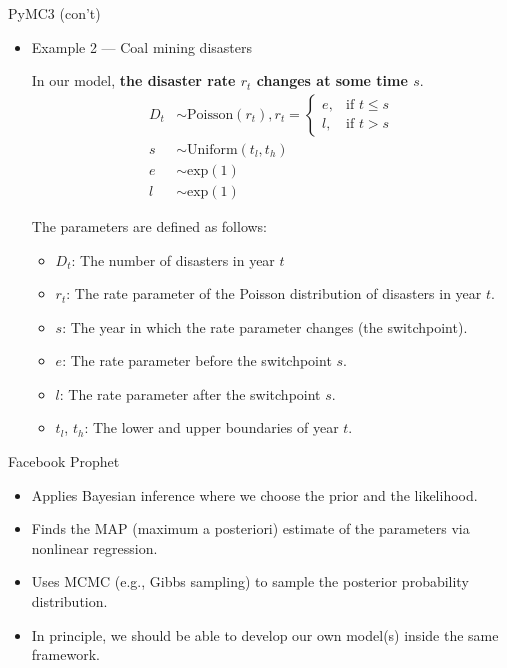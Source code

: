 \documentclass[20pt]{beamer}
\begin{document}
\begin{frame}{PyMC3 (con't)}
\begin{itemize}

  \item Example 2 --- Coal mining disasters

In our model, \textbf{the disaster rate $r_t$ changes at some time $s$}.
\begin{align*}
  D_t &\sim \text{Poisson}(r_t), r_t= \begin{cases}
   e, & \text{if } t \le s \\
   l, & \text{if } t > s
   \end{cases} \\
  s &\sim \text{Uniform}(t_l, t_h)\\
  e &\sim \text{exp}(1)\\
  l &\sim \text{exp}(1)
\end{align*}

The parameters are defined as follows:
  \begin{itemize}
   \item $D_t$: The number of disasters in year $t$
   \item $r_t$: The rate parameter of the Poisson distribution of disasters in year $t$.
   \item $s$: The year in which the rate parameter changes (the switchpoint).
   \item $e$: The rate parameter before the switchpoint $s$.
   \item $l$: The rate parameter after the switchpoint $s$.
   \item $t_l$, $t_h$: The lower and upper boundaries of year $t$.
  \end{itemize}
\end{itemize}
\end{frame}


\begin{frame}{Facebook Prophet}
\begin{itemize}
\item Applies Bayesian inference where we choose the prior and the likelihood.
\item Finds the MAP (maximum a posteriori) estimate of the parameters via nonlinear regression.
\item Uses MCMC (e.g., Gibbs sampling) to sample the posterior probability distribution.
\item In principle, we should be able to develop our own model(s) inside the same framework.
\end{itemize}
\end{frame}
\end{document}
